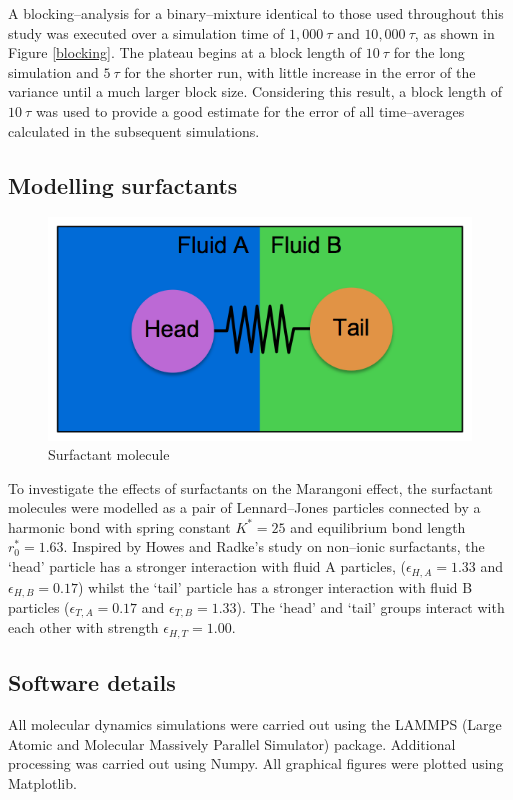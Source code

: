 A blocking--analysis for a binary--mixture identical to those used throughout this study was executed over a simulation time of $1,000\ \tau$ and $10,000\ \tau$, as shown in Figure \ref{blocking}.
The plateau begins at a block length of $10\ \tau$ for the long simulation and $5\ \tau$ for the shorter run, with little increase in the error of the variance until a much larger block size.
Considering this result, a block length of $10\ \tau$ was used to provide a good estimate for the error of all time--averages calculated in the subsequent simulations.

\subsection{Modelling surfactants}
\FloatBarrier

\begin{figure}[h]
\centering
\includegraphics[scale=0.4]{surfactant.png}
\caption{Surfactant molecule}
\label{surfactant}
\end{figure}
To investigate the effects of surfactants on the Marangoni effect, the surfactant molecules were modelled as a pair of Lennard--Jones particles connected by a harmonic bond with spring constant $K^{*} = 25$ and equilibrium bond length $r^{*}_{0}=1.63$.
Inspired by Howes and Radke's study on non--ionic surfactants,\cite{HowesSurfactant} the `head' particle has a stronger interaction with fluid A particles, ($\epsilon_{H, A} = 1.33$ and $\epsilon_{H, B} = 0.17$) whilst the `tail' particle has a stronger interaction with fluid B particles ($\epsilon_{T, A} = 0.17$ and $\epsilon_{T, B} = 1.33$).
The `head' and `tail' groups interact with each other with strength $\epsilon_{H, T} = 1.00$.
\FloatBarrier

\subsection{Software details}
All molecular dynamics simulations were carried out using the LAMMPS (Large Atomic and Molecular Massively Parallel Simulator) package.\cite{LAMMPS}
Additional processing was carried out using Numpy.\cite{NumPy}
All graphical figures were plotted using Matplotlib.\cite{MatPlotLib}

